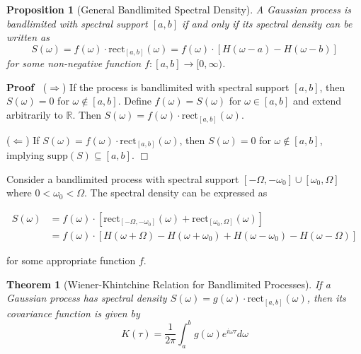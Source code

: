 \documentclass{article}
\newcommand{\nin}{\not\in}
\newenvironment{proof}{\noindent\textbf{Proof\ }}{\hspace*{\fill}$\Box$\medskip}
\newtheorem{proposition}{Proposition}
\newtheorem{theorem}{Theorem}
\begin{document}
\begin{proposition}
  [General Bandlimited Spectral Density] A Gaussian process is bandlimited
  with spectral support $[a, b]$ if and only if its spectral density can be
  written as
  \begin{equation}
    S (\omega) = f (\omega) \cdot \mathrm{rect}_{[a, b]} (\omega) = f (\omega)
    \cdot [H (\omega - a) - H (\omega - b)]
  \end{equation}
  for some non-negative function $f : [a, b] \to [0, \infty)$.
\end{proposition}

\begin{proof}
  ($\Rightarrow$) If the process is bandlimited with spectral support $[a,
  b]$, then $S (\omega) = 0$ for $\omega \nin [a, b]$. Define $f (\omega) = S
  (\omega)$ for $\omega \in [a, b]$ and extend arbitrarily to $\mathbb{R}$.
  Then $S (\omega) = f (\omega) \cdot \mathrm{rect}_{[a, b]} (\omega)$.
  
  ($\Leftarrow$) If $S (\omega) = f (\omega) \cdot \mathrm{rect}_{[a, b]}
  (\omega)$, then $S (\omega) = 0$ for $\omega \nin [a, b]$, implying
  $\mathrm{supp} (S) \subseteq [a, b]$.
\end{proof}

\begin{example}
   Consider a bandlimited process with spectral support $[-
  \Omega, - \omega_0] \cup [\omega_0, \Omega]$ where $0 < \omega_0 < \Omega$.
  The spectral density can be expressed as
  
  \begin{align}
    S (\omega) & = f (\omega) \cdot [\mathrm{rect}_{[- \Omega, - \omega_0]}
    (\omega) + \mathrm{rect}_{[\omega_0, \Omega]} (\omega)] \\
    & = f (\omega) \cdot [H (\omega + \Omega) - H (\omega + \omega_0) + H
    (\omega - \omega_0) - H (\omega - \Omega)] 
  \end{align}
  
  for some appropriate function $f$.
\end{example}

\begin{theorem}
  [Wiener-Khintchine Relation for Bandlimited Processes] If a Gaussian process
  has spectral density $S (\omega) = g (\omega) \cdot \mathrm{rect}_{[a, b]}
  (\omega)$, then its covariance function is given by
  \begin{equation}
    K (\tau) = \frac{1}{2 \pi}  \int_a^b g (\omega) e^{i \omega \tau} d \omega
  \end{equation}
\end{theorem}
\end{document}
